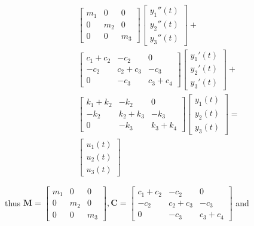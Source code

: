 \documentclass[12pt,a4paper]{article}
\begin{document}
 \begin{equation}
    \begin{split}
    &\begin{bmatrix}
        m_1 & 0   & 0   \\
        0   & m_2 & 0   \\
        0   & 0   & m_3
    \end{bmatrix}
    \begin{bmatrix}
        y_1''(t) \\
        y_2''(t) \\
        y_3''(t)
    \end{bmatrix} + \\
    &\begin{bmatrix}
        c_1+c_2         & -c_2             & 0              \\
        -c_2            & c_2+c_3         & -c_3       \\
        0               & -c_3           & c_3+c_4
    \end{bmatrix}
    \begin{bmatrix}
        y_1'(t) \\
        y_2'(t) \\
        y_3'(t)
    \end{bmatrix} + \\
    &\begin{bmatrix}
        k_1+k_2         & -k_2             & 0              \\
        -k_2            & k_2+k_3         & -k_3       \\
        0               & -k_3           & k_3+k_4
    \end{bmatrix}
    \begin{bmatrix}
        y_1(t) \\
        y_2(t) \\
        y_3(t)
    \end{bmatrix} = \\
    &\begin{bmatrix}
        u_1(t) \\
        u_2(t) \\
        u_3(t)
    \end{bmatrix}
    \end{split}
\end{equation}

thus 
$\mathbf{M} = \begin{bmatrix}
    m_1 & 0   & 0   \\
    0   & m_2 & 0   \\
    0   & 0   & m_3
\end{bmatrix},
\mathbf{\mathbf{C}} = \begin{bmatrix}
    c_1+c_2         & -c_2             & 0              \\
    -c_2            & c_2+c_3         & -c_3       \\
    0               & -c_3           & c_3+c_4
\end{bmatrix}$
and
\end{document}

